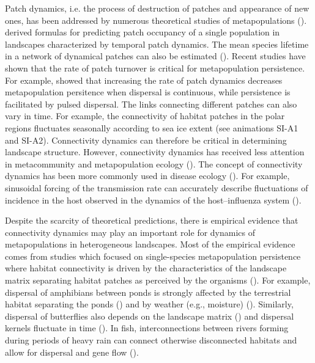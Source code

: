 \documentclass[12pt]{article}
\begin{document}
    Patch dynamics, i.e. the process of destruction of patches and appearance of new ones, has been addressed by numerous theoretical studies of metapopulations (\cite{Hanski1999, Cornell&Ovaskainen2008, DrechslerJohst2010}). \citet{Hanski1999} derived formulas for predicting patch occupancy of a single population in landscapes characterized by temporal patch dynamics. The mean species lifetime in a network of dynamical patches can also be estimated (\cite{DrechslerJohst2010}). Recent studies have shown that the rate of patch turnover is critical for metapopulation persistence. For example, \cite{reigadaetal2015} showed that increasing the rate of patch dynamics decreases metapopulation persitence when dispersal is continuous, while persistence is facilitated by pulsed dispersal. The links connecting different patches can also vary in time. For example, the connectivity of habitat patches in the polar regions fluctuates seasonally according to sea ice extent (see animations SI-A1 and SI-A2). Connectivity dynamics can therefore be critical in determining landscape structure. However, connectivity dynamics has received less attention in metacommunity and metapopulation ecology (\cite{Holyoaketal2005,JohstEtAl2011}). The concept of connectivity dynamics has been more commonly used in disease ecology (\cite{Dushoffetal2004, Keeling&Eames2005, Ross2010}). For example, sinusoidal forcing of the transmission rate can accurately describe fluctuations of incidence in the host observed in the dynamics of the host–influenza system (\cite{Dushoffetal2004}).
    
    Despite the scarcity of theoretical predictions, there is empirical evidence that connectivity dynamics may play an important role for dynamics of metapopulations in heterogeneous landscapes. Most of the empirical evidence comes from studies which focused on single-species metapopulation persistence where habitat connectivity is driven by the characteristics of the landscape matrix separating habitat patches as perceived by the organisms (\cite{EycottEtAl2012}). For example, dispersal of amphibians between ponds is strongly affected by the terrestrial habitat separating the ponds (\cite{VanBuskirk2012, ClineHunter2014}) and by weather (e.g., moisture) (\cite{RittenhouseEtAl2009}). Similarly, dispersal of butterflies also depends on the landscape matrix (\cite{KueflerEtAl2010}) and dispersal kernels fluctuate in time (\cite{SchtickzelleEtAl2012}). In fish, interconnections between rivers forming during periods of heavy rain can connect otherwise disconnected habitats and allow for dispersal and gene flow (\cite{BoizardEtAl2009}).
    
\end{document}
